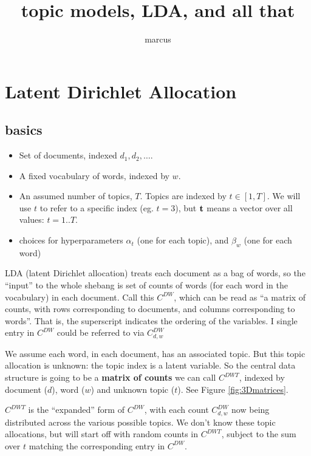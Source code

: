 \documentclass[11pt]{article}
\title{topic models, LDA, and all that}
\author{marcus}
\begin{document}
\maketitle


\tableofcontents

\section{Latent Dirichlet Allocation}

\subsection{basics}

\begin{itemize}
\item Set of documents, indexed $d_1, d_2, \ldots$.
\item A fixed vocabulary of words, indexed by $w$.
\item An assumed number of topics, $T$. Topics are indexed by
  $t\in[1,T]$. We will use $t$ to refer to a specific index (eg. $t=3$), but
  $\mathbf{t}$ means a vector over all values: $t=1..T$.
\item choices for hyperparameters $\alpha_t$ (one for each topic), and $\beta_w$ (one for each word)
\end{itemize}

LDA (latent Dirichlet allocation) treats each document as a bag of
words, so the ``input'' to the whole shebang is set of counts of words
(for each word in the vocabulary) in each document. Call this
$C^{DW}$, which can be read as ``a matrix of counts, with rows
corresponding to documents, and columns corresponding to words''. That is, the superscript indicates the ordering of the variables. I single entry in 
$C^{DW}$ could be referred to via $C^{DW}_{d,w}$

We assume each word, in each document, has an associated topic. But
this topic allocation is unknown: the topic index is a latent
variable. So the central data structure is going to be a {\bf matrix
  of counts} we can call $C^{DWT}$, indexed by document ($d$), word
($w$) and unknown topic ($t$). See Figure \ref{fig:3Dmatrices}.  

$C^{DWT}$ is the ``expanded'' form of $C^{DW}$, with each count
$C^{DW}_{d,w}$ now being distributed across the various possible
topics.  We don't know these topic allocations, but will start off
with random counts in $C^{DWT}$, subject to the sum over $t$ matching
the corresponding entry in $C^{DW}$.
\end{document}
